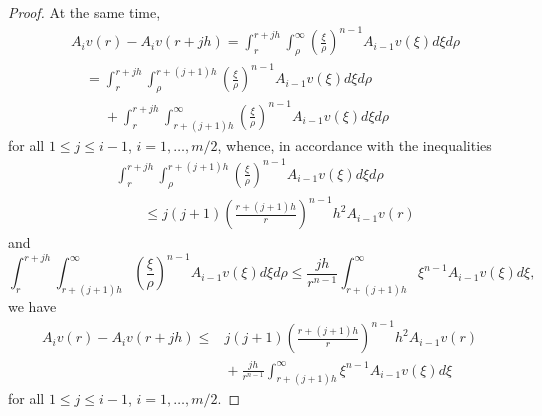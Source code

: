 \documentclass[11pt]{amsart}
\theoremstyle{definition}
\numberwithin{equation}{section}
\begin{document}
\begin{proof}
At the same time,
\begin{align*}
	&
	A_i v (r) - A_i v (r + j h)
	=
	\int_r^{r + j h}
	\int_\rho^\infty
	\left(
		\frac{\xi}{\rho}
	\right)^{n - 1}
	A_{i-1} v (\xi)
	d\xi
	d\rho
	\\
	&
	\quad
	{}
	=
	\int_r^{r + j h}
	\int_\rho^{r + (j + 1) h}
	\left(
		\frac{\xi}{\rho}
	\right)^{n - 1}
	A_{i-1} v (\xi)
	d\xi
	d\rho
	\\
	&
	\quad
	\phantom{{}={}}
	{}
	+
	\int_r^{r + j h}
	\int_{r + (j + 1) h}^\infty
	\left(
		\frac{\xi}{\rho}
	\right)^{n - 1}
	A_{i-1} v (\xi)
	d\xi
	d\rho
\end{align*}
for all $1 \le j \le i - 1$, $i = 1, \ldots, m / 2$,
whence, in accordance with the inequalities
\begin{align*}
	&
	\int_r^{r + j h}
	\int_\rho^{r + (j + 1) h}
	\left(
		\frac{\xi}{\rho}
	\right)^{n - 1}
	A_{i-1} v (\xi)
	d\xi
	d\rho
	\\
	&
	\qquad
	{}
	\le
	j (j + 1)
	\left(
		\frac{r + (j + 1) h}{r}
	\right)^{n - 1}
	h^2
	A_{i - 1} v (r)
\end{align*}
and
$$
	\int_r^{r + j h}
	\int_{r + (j + 1) h}^\infty
	\left(
		\frac{\xi}{\rho}
	\right)^{n - 1}
	A_{i-1} v (\xi)
	d\xi
	d\rho
	\le
	\frac{
		j h
	}{
		r^{n - 1}
	}
	\int_{r + (j + 1) h}^\infty
	\xi^{n - 1}
	A_{i-1} v (\xi)
	d\xi,
$$
we have
\begin{align}
	A_i v (r) - A_i v (r + j h)
	\le
	{}
	&
	j (j + 1)
	\left(
		\frac{r + (j + 1) h}{r}
	\right)^{n - 1}
	h^2
	A_{i - 1} v (r)
	\label{PT2.2.5}
	\\
	&
	{}
	+
	\frac{
		j h
	}{
		r^{n - 1}
	}
	\int_{r + (j + 1) h}^\infty
	\xi^{n - 1}
	A_{i-1} v (\xi)
	d\xi
	\nonumber
\end{align}
for all $1 \le j \le i - 1$, $	i = 1, \ldots, m / 2$.


\end{proof}
\end{document}
